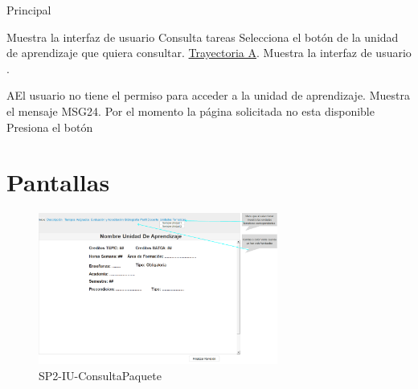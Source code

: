 \begin{UCtrayectoria}{Principal}


    \UCpaso Muestra la interfaz de usuario Consulta tareas  %
    \UCpaso [\UCactor] Selecciona el botón  de la unidad de aprendizaje que quiera consultar. \hyperref[SP2-CU1-A]{Trayectoria A}.
    \UCpaso  Muestra la interfaz de usuario .

\end{UCtrayectoria}


\label{SP2-CU1-A}
\begin{UCtrayectoriaA}{A}{El usuario no tiene el permiso para acceder a la unidad de aprendizaje.}
    \UCpaso Muestra el mensaje MSG24. Por el momento la página solicitada no esta disponible
    \UCpaso[\UCactor] Presiona el botón 
\end{UCtrayectoriaA}

\chapter{Pantallas}
 \begin{figure}
  \centering
    \includegraphics[width=0.7\textwidth]{DCU/SP2/Pantallas/Inicio}
  \caption{SP2-IU-ConsultaPaquete}
  \label{SP2-IU-ConsultaPaquete}
\end{figure}


